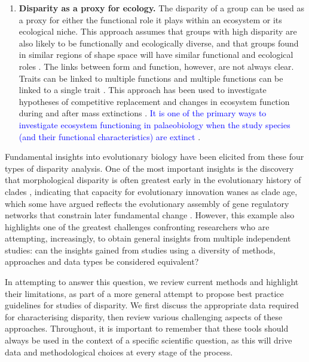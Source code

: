 \documentclass[12pt,letterpaper]{article}
\begin{document}
\begin{enumerate}
	\item \textbf{Disparity as a proxy for ecology.} The disparity of a group can be used as a proxy for either the functional role it plays within an ecosystem or its ecological niche.
	This approach assumes that groups with high disparity are also likely to be functionally and ecologically diverse, and that groups found in similar regions of shape space will have similar functional and ecological roles \citep{Pierce2008, Friedman2010}.
	The links between form and function, however, are not always clear.
	Traits can be linked to multiple functions and multiple functions can be linked to a single trait \citep{Wainwright2005}.
	This approach has been used to investigate hypotheses of competitive replacement \citep{tyler2011detecting} and changes in ecosystem function during and after mass extinctions \citep{Friedman2010}.
    \textcolor{blue}{It is one of the primary ways to investigate ecosystem functioning in palaeobiology when the study species (and their functional characteristics) are extinct} \citep{Wainwright2005}.

\end{enumerate}

Fundamental insights into evolutionary biology have been elicited from these four types of disparity analysis.
One of the most important insights is the discovery that morphological disparity is often greatest early in the evolutionary history of clades \citep{Foote1997, Erwin2007, Hughes2013}, indicating that capacity for evolutionary innovation wanes as clade age, which some have argued reflects the evolutionary assembly of gene regulatory networks that constrain later fundamental change \citep{Erwin2007, Hughes2013}.
However, this example also highlights one of the greatest challenges confronting researchers who are attempting, increasingly, to obtain general insights from multiple independent studies: can the insights gained from studies using a diversity of methods, approaches and data types be considered equivalent?

In attempting to answer this question, we review current methods and highlight their limitations, as part of a more general attempt to propose best practice guidelines for studies of disparity.
We first discuss the appropriate data required for characterising disparity, then review various challenging aspects of these approaches.
Throughout, it is important to remember that these tools should always be used in the context of a specific scientific question, as this will drive data and methodological choices at every stage of the process.
\end{document}
